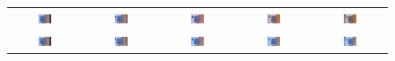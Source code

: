\begin{figure}[H]
\begin{tabular}{ccccc}
\includegraphics[width = 0.2\textwidth]{Chapters/Images/Seq_init/1}&
\includegraphics[width = 0.2\textwidth]{Chapters/Images/Seq_init/2}&
\includegraphics[width = 0.2\textwidth]{Chapters/Images/Seq_init/3}&
\includegraphics[width = 0.2\textwidth]{Chapters/Images/Seq_init/4}&
\includegraphics[width = 0.2\textwidth]{Chapters/Images/Seq_init/5}\\

\includegraphics[width = 0.2\textwidth]{Chapters/Images/Seq_cold/1}&
\includegraphics[width = 0.2\textwidth]{Chapters/Images/Seq_cold/2}&
\includegraphics[width = 0.2\textwidth]{Chapters/Images/Seq_cold/3}&
\includegraphics[width = 0.2\textwidth]{Chapters/Images/Seq_cold/4}&
\includegraphics[width = 0.2\textwidth]{Chapters/Images/Seq_cold/5}\\


\end{tabular}
\end{figure}
